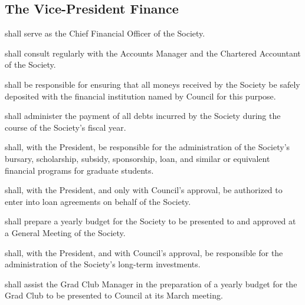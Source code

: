\subsection {The Vice-President Finance} 
\begin{longenum}[ label*=\arabic*., align=left]
	\item shall serve as the Chief Financial Officer of the Society.
    \item shall consult regularly with the Accounts Manager and the Chartered Accountant of the Society.
    \item shall be responsible for ensuring that all moneys received by the Society be safely deposited with the financial institution named by Council for this purpose.
    \item shall administer the payment of all debts incurred by the Society during the course of the Society's fiscal year.
    \item shall, with the President, be responsible for the administration of the Society's bursary, scholarship, subsidy, sponsorship, loan, and similar or equivalent financial programs for graduate students.
    \item shall, with the President, and only with Council's approval, be authorized to enter into loan agreements on behalf of the Society. 
    \item shall prepare a yearly budget for the Society to be presented to and approved at a General Meeting of the Society.
    \item shall, with the President, and with Council's approval, be responsible for the administration of the Society's long-term investments.
    \item shall assist the Grad Club Manager in the preparation of a yearly budget for the Grad Club to be presented to Council at its March meeting. 

\end{longenum}
